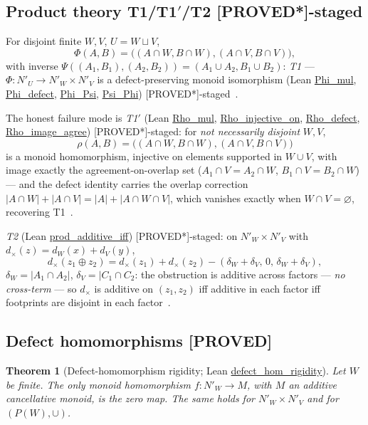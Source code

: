 \documentclass[11pt,a4paper]{article}
\newtheorem{theorem}{Theorem}
\theoremstyle{definition}
\begin{document}
\subsection{Product theory T1/T1$'$/T2 [PROVED*]-staged}

For disjoint finite $W,V$, $U=W\sqcup V$,
\begin{equation}
  \label{eq:phipsi}
  \Phi(A,B)=\bigl((A\cap W,B\cap W),(A\cap V,B\cap V)\bigr),
\end{equation}
with inverse $\Psi((A_1,B_1),(A_2,B_2))=(A_1\cup A_2,B_1\cup B_2)$:
\emph{T1} — $\Phi:N'_U\to N'_W\times N'_V$ is a defect-preserving
monoid isomorphism (Lean \url{Phi_mul}, \url{Phi_defect},
\url{Phi_Psi}, \url{Psi_Phi}) [PROVED*]-staged~\cite{D319}.

The honest failure mode is \emph{T1$'$} (Lean
\url{Rho_mul}, \url{Rho_injective_on}, \url{Rho_defect},
\url{Rho_image_agree}) [PROVED*]-staged: for \emph{not necessarily
disjoint} $W,V$,
\begin{equation}
  \label{eq:rho}
  \rho(A,B)=\bigl((A\cap W,B\cap W),(A\cap V,B\cap V)\bigr)
\end{equation}
is a monoid homomorphism, injective on elements supported in $W\cup V$,
with image exactly the agreement-on-overlap set
($A_1\cap V=A_2\cap W$, $B_1\cap V=B_2\cap W$) — and the defect identity
carries the overlap correction
$|A\cap W|+|A\cap V|=|A|+|A\cap W\cap V|$, which vanishes exactly when
$W\cap V=\varnothing$, recovering T1~\cite{D319}.

\emph{T2} (Lean \url{prod_additive_iff}) [PROVED*]-staged: on
$N'_W\times N'_V$ with $d_\times(z)=d_W(x)+d_V(y)$,
\begin{equation}
  \label{eq:proddefect}
  d_\times(z_1\oplus z_2)=d_\times(z_1)+d_\times(z_2)
  -(\delta_W+\delta_V,\,0,\,\delta_W+\delta_V),
\end{equation}
$\delta_W=|A_1\cap A_2|$, $\delta_V=|C_1\cap C_2$: the obstruction is
additive across factors — \emph{no cross-term} — so $d_\times$ is
additive on $(z_1,z_2)$ iff additive in each factor iff footprints are
disjoint in each factor~\cite{D319}.

\subsection{Defect homomorphisms [PROVED]}

\begin{theorem}[Defect-homomorphism rigidity; Lean
  \url{defect_hom_rigidity}]
  \label{thm:h1}
  Let $W$ be finite. The only monoid homomorphism
  $f:N'_W\to M$, with $M$ an additive cancellative monoid, is the zero
  map. The same holds for $N'_W\times N'_V$ and for $(P(W),\cup)$.
\end{theorem}
\end{document}
